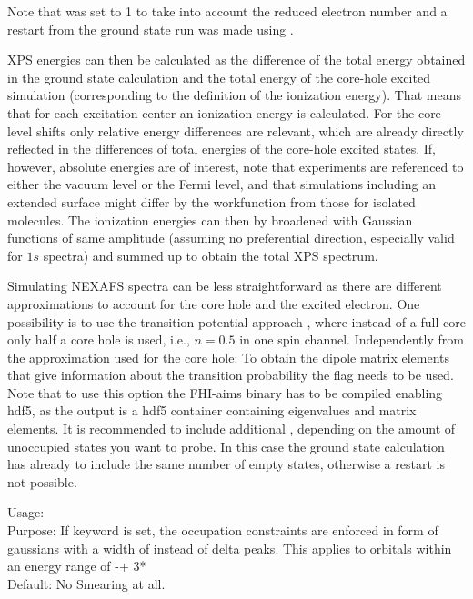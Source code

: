 Note that  was set to 1 to take into account the reduced electron number and a restart from the ground state run was made using .

XPS energies can then be calculated as the difference of the total energy obtained in the ground state calculation and the total energy of the core-hole excited simulation (corresponding to the definition of the ionization energy). That means that for each excitation center an ionization energy is calculated. For the core level shifts only relative energy differences are relevant, which are already directly reflected in the differences of total energies of the core-hole excited states. If, however, absolute energies are of interest, note that experiments are referenced to either the vacuum level or the Fermi level, and that simulations including an extended surface might differ by the workfunction from those for isolated molecules. The ionization energies can then by broadened with Gaussian functions of same amplitude (assuming no preferential direction, especially valid for $1s$ spectra) and summed up to obtain the total XPS spectrum.

Simulating NEXAFS spectra can be less straightforward as there are different approximations to account for the core hole and the excited electron. One possibility is to use the transition potential approach \cite{Triguero1998}, where instead of a full core only half a core hole is used, i.e., $n = 0.5$ in one spin channel. Independently from the approximation used for the core hole: To obtain the dipole matrix elements that give information about the transition probability the flag  needs to be used. Note that to use this option the FHI-aims binary has to be compiled enabling hdf5, as the output is a hdf5 container containing eigenvalues and matrix elements. It is recommended to include additional , depending on the amount of unoccupied states you want to probe. In this case the ground state calculation has already to include the same number of empty states, otherwise a restart is not possible.


{
  \noindent
  Usage:   \\[1.0ex]
  Purpose: If keyword is set, the occupation constraints are enforced in form of gaussians 
  with a width of  instead of delta peaks. This applies to
  orbitals within an energy range of -+ 3* \\[1.0ex]
  Default: No Smearing at all. \\
}

